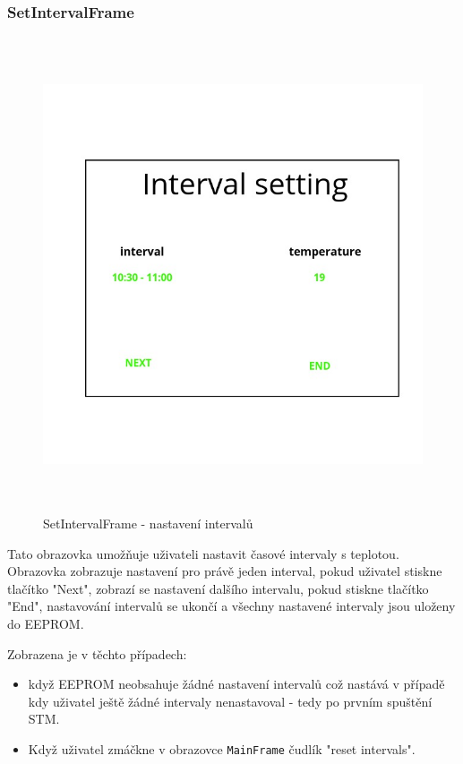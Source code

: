 \subsubsection{SetIntervalFrame}
\begin{figure}[p]\centering
\includegraphics[width=140mm, height=140mm]{../img/interval_setting_frame.jpg}
\caption{SetIntervalFrame - nastavení intervalů}
\label{set-interval-frame}
\end{figure}

Tato obrazovka umožňuje uživateli nastavit časové intervaly s teplotou.
Obrazovka zobrazuje nastavení pro právě jeden interval, pokud uživatel stiskne tlačítko
"Next", zobrazí se nastavení dalšího intervalu, pokud stiskne tlačítko "End", nastavování
intervalů se ukončí a všechny nastavené intervaly jsou uloženy do EEPROM.

Zobrazena je v těchto případech:
\begin{itemize}
  \item když EEPROM neobsahuje žádné nastavení intervalů což nastává v případě kdy uživatel
    ještě žádné intervaly nenastavoval - tedy po prvním spuštění STM.
  \item Když uživatel zmáčkne v obrazovce \texttt{MainFrame} čudlík "reset intervals".
\end{itemize}

